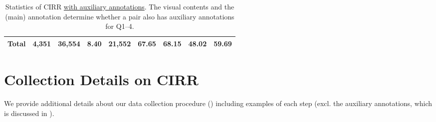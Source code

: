 \documentclass[10pt,twocolumn,letterpaper]{article}
\newcommand{\dstname}{CIRR\xspace}
\begin{document}
\begin{table}[!ht]
{\begin{tabular}{l rrrrrrrr}
      \midrule
      Total                & 4,351                                                                                        & 36,554                                                                                                    & 8.40                                                                                                & 21,552                                      & 67.65 & 68.15 & 48.02 & 59.69                                  \\
      \bottomrule
    \end{tabular}}
    \caption{Statistics of CIRR \underline{with auxiliary annotations}. The visual contents and the (main) annotation determine whether a pair also has auxiliary annotations for Q1--4.}
    \label{tab:dst_stats_ext}
\end{table}
 
\section{Collection Details on \dstname}
We provide additional details about our data collection procedure () including examples of each step (excl. the auxiliary annotations, which is discussed in ).
\end{document}
